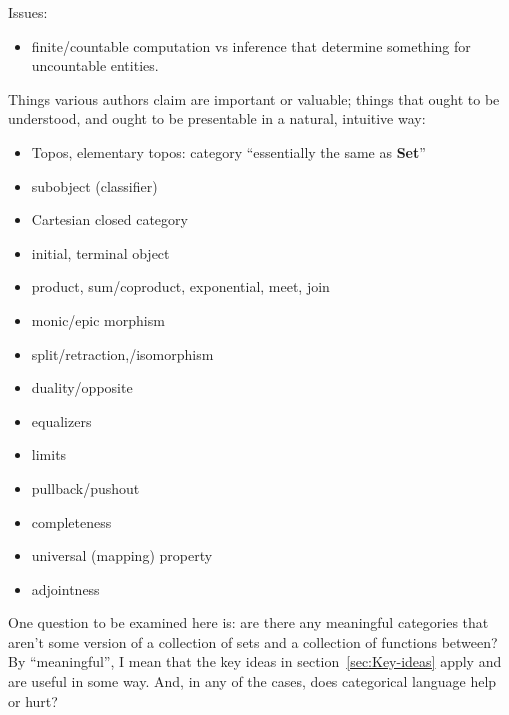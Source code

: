 \documentclass[11pt]{book}
\begin{document}
Issues: 
\begin{itemize}
  \item finite/countable computation vs inference that determine
something for uncountable entities.
  \end{itemize}

\setcounter{currentlevel}{\value{baseSectionLevel}}
\label{sec:Key-ideas}

Things various authors claim are important or valuable;
things that ought to be understood,
and ought to be presentable in a natural, intuitive way:
\begin{itemize}
  \item Topos, elementary topos: 
  category ``essentially the same as \textbf{Set}''
  \item subobject (classifier)
  \item Cartesian closed category
  \item initial, terminal object
  \item product, sum/coproduct, exponential, meet, join
  \item monic/epic morphism
  \item split/retraction,/isomorphism
  \item duality/opposite
  \item equalizers
  \item limits
  \item pullback/pushout
  \item completeness
  \item universal (mapping) property
  \item adjointness
\end{itemize}

\setcounter{currentlevel}{\value{baseSectionLevel}}
\label{sec:Example-categories}

One question to be examined here is: are there any meaningful
categories that aren't some version of a collection of sets
and a collection of functions between? 
By ``meaningful'', I mean that the key ideas 
in section~\ref{sec:Key-ideas} apply
and are useful in some way.
And, in any of the cases, 
does categorical language help or hurt?
\end{document}
